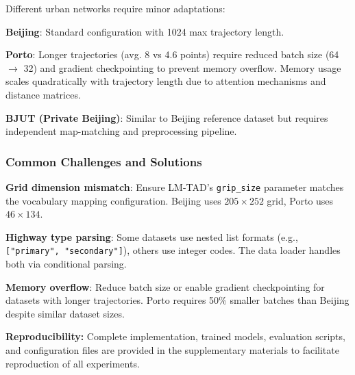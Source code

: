 Different urban networks require minor adaptations:

\textbf{Beijing}: Standard configuration with 1024 max trajectory length.

\textbf{Porto}: Longer trajectories (avg. 8 vs 4.6 points) require reduced batch size (64 $\rightarrow$ 32) and gradient checkpointing to prevent memory overflow. Memory usage scales quadratically with trajectory length due to attention mechanisms and distance matrices.

\textbf{BJUT (Private Beijing)}: Similar to Beijing reference dataset but requires independent map-matching and preprocessing pipeline.

\subsubsection{Common Challenges and Solutions}

\textbf{Grid dimension mismatch}: Ensure LM-TAD's \texttt{grip\_size} parameter matches the vocabulary mapping configuration. Beijing uses $205 \times 252$ grid, Porto uses $46 \times 134$.

\textbf{Highway type parsing}: Some datasets use nested list formats (e.g., \texttt{["primary", "secondary"]}), others use integer codes. The data loader handles both via conditional parsing.

\textbf{Memory overflow}: Reduce batch size or enable gradient checkpointing for datasets with longer trajectories. Porto requires 50\% smaller batches than Beijing despite similar dataset sizes.

\textbf{Reproducibility:} Complete implementation, trained models, evaluation scripts, and configuration files are provided in the supplementary materials to facilitate reproduction of all experiments.

